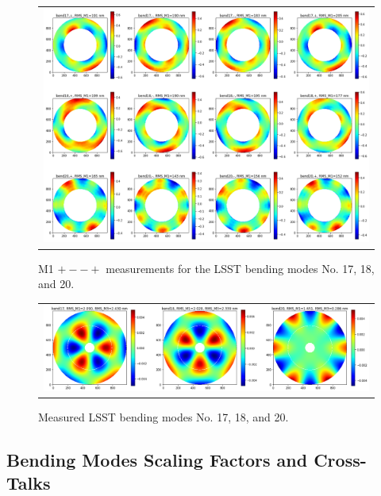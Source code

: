 \documentclass [twoside,openbib,12pt]{article}
\begin{document}
 \begin{figure}[bthp]
   \begin{center}
     \begin{tabular}{c}
\includegraphics[width=150mm]{figures/m1pmmp.png}      
  \end{tabular}
   \end{center}
   \caption
   { \label{fig:m1pmmp}
     M1 $+--+$ measurements
 for the LSST bending modes No. 17, 18, and 20.
 }
\end{figure}

 \begin{figure}[bthp]
   \begin{center}
     \begin{tabular}{c}
\includegraphics[width=150mm]{figures/measuredBM.png}
  \end{tabular}
   \end{center}
   \caption
  { \label{fig:measuredBM}
Measured LSST bending modes No. 17, 18, and 20.
 }
\end{figure}

\subsection{Bending Modes Scaling Factors and Cross-Talks}
\label{sec:finalBM}
\end{document}
